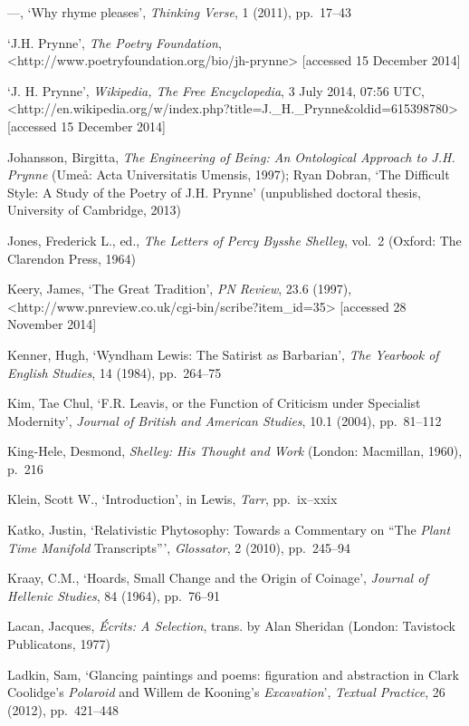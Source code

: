 \documentclass[]{article}
\begin{document}
—, ‘Why rhyme pleases’, \emph{Thinking Verse}, 1 (2011), pp.~17–43

‘J.H. Prynne’, \emph{The Poetry Foundation},\\
\textless{}http://www.poetryfoundation.org/bio/jh-prynne\textgreater{}
{[}accessed 15 December 2014{]}

‘J. H. Prynne’, \emph{Wikipedia, The Free Encyclopedia}, 3 July 2014,
07:56 UTC,\\
\textless{}http://en.wikipedia.org/w/index.php?title=J.\_H.\_Prynne\&oldid=615398780\textgreater{}
{[}accessed 15 December 2014{]}

Johansson, Birgitta, \emph{The Engineering of Being: An Ontological
Approach to J.H. Prynne} (Umeå: Acta Universitatis Umensis, 1997); Ryan
Dobran, ‘The Difficult Style: A Study of the Poetry of J.H. Prynne’
(unpublished doctoral thesis, University of Cambridge, 2013)

Jones, Frederick L., ed., \emph{The Letters of Percy Bysshe Shelley},
vol.~2 (Oxford: The Clarendon Press, 1964)

Keery, James, ‘The Great Tradition’, \emph{PN Review}, 23.6 (1997),\\
\textless{}http://www.pnreview.co.uk/cgi-bin/scribe?item\_id=35\textgreater{}
{[}accessed 28 November 2014{]}

Kenner, Hugh, ‘Wyndham Lewis: The Satirist as Barbarian’, \emph{The
Yearbook of English Studies}, 14 (1984), pp.~264–75

Kim, Tae Chul, ‘F.R. Leavis, or the Function of Criticism under
Specialist Modernity’, \emph{Journal of British and American Studies},
10.1 (2004), pp.~81–112

King-Hele, Desmond, \emph{Shelley: His Thought and Work} (London:
Macmillan, 1960), p.~216

Klein, Scott W., ‘Introduction’, in Lewis, \emph{Tarr}, pp.~ix–xxix

Katko, Justin, ‘Relativistic Phytosophy: Towards a Commentary on “The
\emph{Plant Time Manifold} Transcripts”’, \emph{Glossator}, 2 (2010),
pp.~245–94

Kraay, C.M., ‘Hoards, Small Change and the Origin of Coinage’,
\emph{Journal of Hellenic Studies}, 84 (1964), pp.~76–91

Lacan, Jacques, \emph{Écrits: A Selection}, trans. by Alan Sheridan
(London: Tavistock Publicatons, 1977)

Ladkin, Sam, ‘Glancing paintings and poems: figuration and abstraction
in Clark Coolidge’s \emph{Polaroid} and Willem de Kooning’s
\emph{Excavation}’, \emph{Textual Practice}, 26 (2012), pp.~421–448
\end{document}
